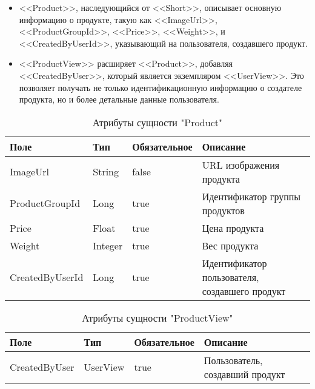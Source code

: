 \begin{itemize}
    \item <<Product>>, наследующийся от <<Short>>, описывает основную информацию о продукте, такую как <<ImageUrl>>, <<ProductGroupId>>, <<Price>>, <<Weight>>, и <<CreatedByUserId>>, указывающий на пользователя, создавшего продукт.
    \item <<ProductView>> расширяет <<Product>>, добавляя <<CreatedByUser>>, который является экземпляром <<UserView>>. Это позволяет получать не только идентификационную информацию о создателе продукта, но и более детальные данные пользователя.
\end{itemize}

\begin{xltabular}{\textwidth}{|l|l|p{1.7cm}|X|}
    \caption{Атрибуты сущности "Product"}\\ \hline
    Поле & Тип & Обяза\-тельное & Описание \\ \hline
    ImageUrl & String & false & URL изображения продукта \\ \hline
    ProductGroupId & Long & true & Идентификатор группы продуктов \\ \hline
    Price & Float & true & Цена продукта \\ \hline
    Weight & Integer & true & Вес продукта \\ \hline
    CreatedByUserId & Long & true & Идентификатор пользователя, создавшего продукт \\ \hline
\end{xltabular}

\begin{xltabular}{\textwidth}{|l|l|p{1.7cm}|X|}
    \caption{Атрибуты сущности "ProductView"}\\ \hline
    Поле & Тип & Обяза\-тельное & Описание \\ \hline
    CreatedByUser & UserView & true & Пользователь, создавший продукт \\ \hline
\end{xltabular}




